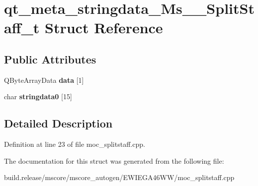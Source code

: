 \hypertarget{structqt__meta__stringdata___ms_____split_staff__t}{}\section{qt\+\_\+meta\+\_\+stringdata\+\_\+\+Ms\+\_\+\+\_\+\+Split\+Staff\+\_\+t Struct Reference}
\label{structqt__meta__stringdata___ms_____split_staff__t}
\subsection*{Public Attributes}
\begin{DoxyCompactItemize}
\item 
\mbox{\label{structqt__meta__stringdata___ms_____split_staff__t_a1185ec8bede4a37a36cf957daba3e88d}} 
Q\+Byte\+Array\+Data {\bfseries data} \mbox{[}1\mbox{]}
\item 
\mbox{\label{structqt__meta__stringdata___ms_____split_staff__t_a8bd297188cfa2cc99b21f7c2a2ad9816}} 
char {\bfseries stringdata0} \mbox{[}15\mbox{]}
\end{DoxyCompactItemize}


\subsection{Detailed Description}


Definition at line 23 of file moc\+\_\+splitstaff.\+cpp.



The documentation for this struct was generated from the following file\+:\begin{DoxyCompactItemize}
\item 
build.\+release/mscore/mscore\+\_\+autogen/\+E\+W\+I\+E\+G\+A46\+W\+W/moc\+\_\+splitstaff.\+cpp\end{DoxyCompactItemize}
